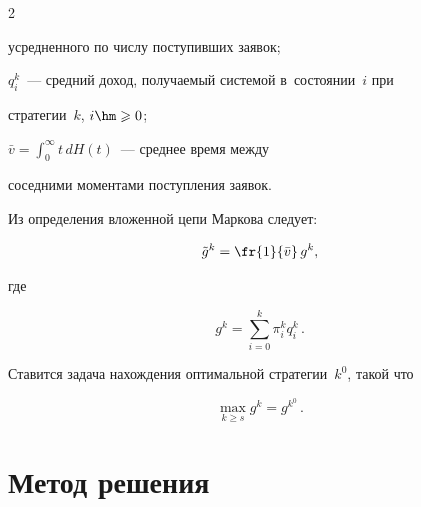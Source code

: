 \begin{multicols}{2}
\begin{description}
усредненного по числу поступивших заявок;\\[-14.5pt]


\item


$q_i^k$~--- средний доход, получаемый системой в~состоянии~$i$ при


стратегии~$k$, $i\hm\geqslant 0$;\\[-14.5pt]


\item


$\bar{v}=\int\nolimits_0^{\infty}t\,dH(t)$~--- среднее время между


соседними моментами поступления заявок.


\end{description}





Из определения вложенной цепи Маркова следует:


\begin{equation}


\tilde{g}^k=\fr{1}{\bar{v}}\,g^k,


\label{1} 


\end{equation}


где


$$


g^k=\sum\limits_{i=0}^k\pi_i^kq_i^k\,.


$$








Ставится задача нахождения оптимальной стратегии~$k^0$, такой что


\begin{equation*}


 \max\limits_{k\geqslant s}g^k=g^{k^0}\,.


\end{equation*}





\vspace*{-6pt}





\section{Метод решения}






\end{multicols}
